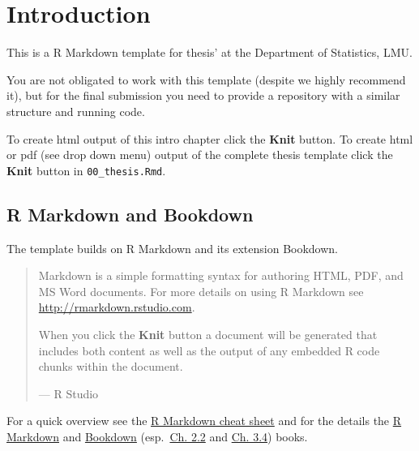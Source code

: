 \documentclass[
]{scrartcl}
\begin{document}
\newpage

{
\hypersetup{linkcolor=}
\setcounter{tocdepth}{2}
\tableofcontents
}
\newpage
\listoffigures
\newpage


\hypertarget{sec:intro}{%
\section{Introduction}\label{sec:intro}}

This is a R Markdown template for thesis' at the Department of Statistics, LMU.

You are not obligated to work with this template (despite we highly recommend it), but for the final submission you need
to provide a repository with a similar structure and running code.

To create html output of this intro chapter click the \textbf{Knit} button. To create html or pdf (see drop down menu) output of
the complete thesis template click the \textbf{Knit} button in \texttt{00\_thesis.Rmd}.

\hypertarget{r-markdown-and-bookdown}{%
\subsection{R Markdown and Bookdown}\label{r-markdown-and-bookdown}}

The template builds on R Markdown and its extension Bookdown.

\begin{quote}
Markdown is a simple formatting syntax for authoring HTML, PDF, and MS Word documents. For more details on using R
Markdown see \url{http://rmarkdown.rstudio.com}.

When you click the \textbf{Knit} button a document will be generated that includes both content as well as the output of any
embedded R code chunks within the document.

--- R Studio
\end{quote}

For a quick overview see the \href{https://raw.githubusercontent.com/rstudio/cheatsheets/main/rmarkdown.pdf}{R Markdown cheat sheet}
and for the details the \href{https://bookdown.org/yihui/rmarkdown}{R Markdown} and \href{https://bookdown.org/yihui/bookdown/}{Bookdown}
(esp.~\href{https://bookdown.org/yihui/bookdown/markdown-extensions-by-bookdown.html}{Ch. 2.2} and \href{https://bookdown.org/yihui/bookdown/a-single-document.html}{Ch. 3.4}) books.
\end{document}
